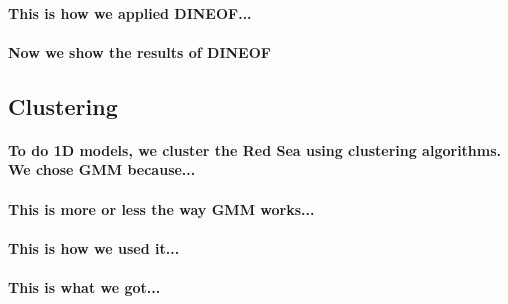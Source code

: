 \paragraph{This is how we applied DINEOF...}

\paragraph{Now we show the results of DINEOF}

\subsection{Clustering}

\paragraph{To do 1D models, we cluster the Red Sea using clustering
algorithms. We chose GMM because...}

\paragraph{This is more or less the way GMM works...}

\paragraph{This is how we used it...}

\paragraph{This is what we got...}
